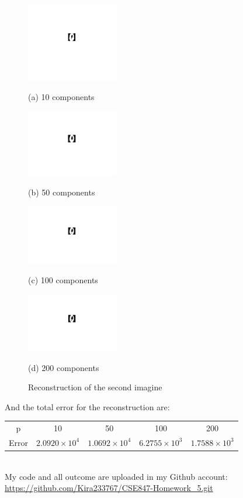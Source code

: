 \documentclass[letterpaper,12pt]{article}
\begin{document}
\begin{center}
\begin{figure}[h]

\begin{minipage}{0.48\linewidth}
  \centerline{\includegraphics[width=4.0cm]{pca2_10.jpg}}
  \centerline{(a) 10 components}
\end{minipage}
\hfill
\begin{minipage}{.48\linewidth}
  \centerline{\includegraphics[width=4.0cm]{pca2_50.jpg}}
  \centerline{(b) 50 components}
\end{minipage}
\vfill
\begin{minipage}{0.48\linewidth}
  \centerline{\includegraphics[width=4.0cm]{pca2_100.jpg}}
  \centerline{(c) 100 components}
\end{minipage}
\hfill
\begin{minipage}{0.48\linewidth}
  \centerline{\includegraphics[width=4.0cm]{pca2_200.jpg}}
  \centerline{(d) 200 components}
\end{minipage}
\caption{Reconstruction of the second imagine}
\label{fig:res}

\end{figure}
\end{center}
And the total error for the reconstruction are:
\begin{center}

\begin{tabular}{c c c c c}
\hline
p & 10 & 50 & 100 & 200 \\
Error & $2.0920 \times 10 ^ 4$ & $1.0692\times 10 ^ 4$ & $6.2755\times 10 ^ 3$ & $1.7588\times 10 ^ 3$ \\
\hline
\end{tabular}
\end{center}
\quad \\

My code and all outcome are uploaded in my Github account:
\url{https://github.com/Kira233767/CSE847-Homework_5.git}
\end{document}

